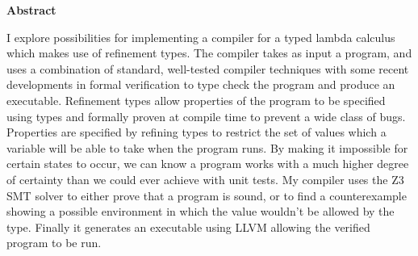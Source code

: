 \begin{center}
    \large
    \textbf{Abstract}
\end{center}
I explore possibilities for implementing a compiler for a typed lambda calculus which makes use of
refinement types.
The compiler takes as input a program, and uses a combination of standard, well-tested compiler techniques
with some recent developments in formal verification to type check the program and produce an executable.
Refinement types allow properties of the program to be specified using types and formally proven at
compile time to prevent a wide class of bugs.
Properties are specified by refining types to restrict the set of values which a variable will be
able to take when the program runs.
By making it impossible for certain states to occur, we can know a program works with a much higher
degree of certainty than we could ever achieve with unit tests.
My compiler uses the Z3 SMT solver to either prove that a program is sound, or to find a counterexample
showing a possible environment in which the value wouldn't be allowed by the type.
Finally it generates an executable using LLVM allowing the verified program to be run.
